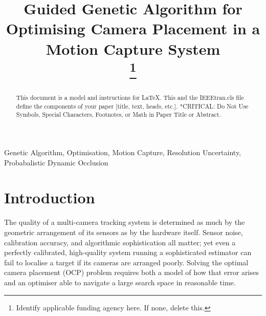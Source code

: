 \documentclass[conference]{IEEEtran}
\begin{document}
\title{Guided Genetic Algorithm for Optimising Camera Placement in a Motion Capture System\\
\thanks{Identify applicable funding agency here. If none, delete this.}
}

\author{
\and
{}
}

\maketitle

\begin{abstract}
This document is a model and instructions for \LaTeX.
This and the IEEEtran.cls file define the components of your paper [title, text, heads, etc.]. *CRITICAL: Do Not Use Symbols, Special Characters, Footnotes,
or Math in Paper Title or Abstract.
\end{abstract}

\begin{IEEEkeywords}
Genetic Algorithm, Optimisation, Motion Capture, Resolution Uncertainty, Probabalistic Dynamic Occlusion
\end{IEEEkeywords}

\section{Introduction}
\label{sec: Introduction}
The quality of a multi-camera tracking system is determined as much by the geometric arrangement of its sensors as by the hardware itself.
Sensor noise, calibration accuracy, and algorithmic sophistication all matter; yet even a perfectly calibrated, high-quality system running a sophisticated estimator can fail to localise a target if its cameras are arranged poorly. Solving the optimal camera placement (OCP) problem requires both a model of how that error arises and an optimiser able to navigate a large search space in reasonable time.
\end{document}
